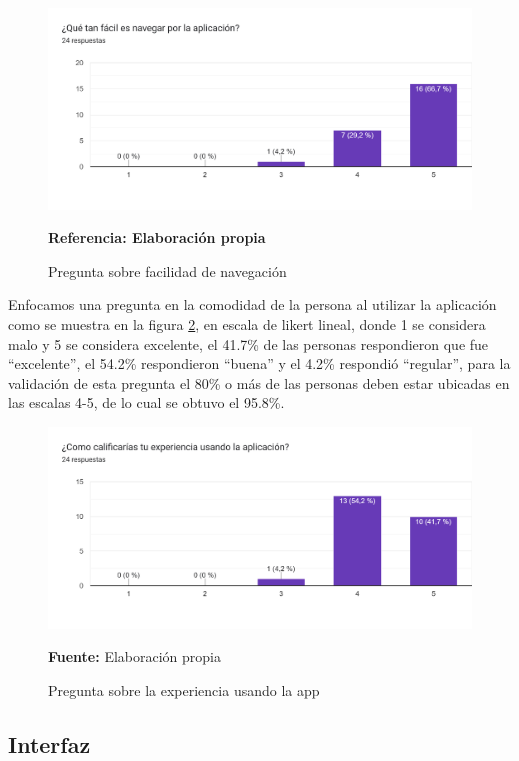 \documentclass[12pt,twocolumn,a4paper]{article}
\begin{document}
\begin{figure}[h!]
	\centering
	\includegraphics[scale=0.2]{Encuesta2.png}
	\caption{Pregunta sobre facilidad de navegación} \textbf{Referencia: Elaboración propia} 
	\label{Encuesta2}
\end{figure}


Enfocamos una pregunta en la comodidad de la persona al utilizar la aplicación como se muestra en la figura \ref{Encuesta3},  en escala de likert lineal, donde 1 se considera malo y 5 se considera excelente, el 41.7\% de las personas respondieron que fue “excelente”, el 54.2\% respondieron “buena” y el 4.2\% respondió “regular”,  para la validación de esta pregunta el 80\% o más de las personas deben estar ubicadas en las escalas 4-5, de lo cual se obtuvo el 95.8\%.

\begin{figure}[h!]
	\centering
	\includegraphics[scale=0.2]{Encuesta3.png}
	\caption{Pregunta sobre la experiencia usando la app} \textbf{Fuente:} Elaboración propia 
	\label{Encuesta3}
\end{figure}

\subsection{Interfaz}
\end{document}
